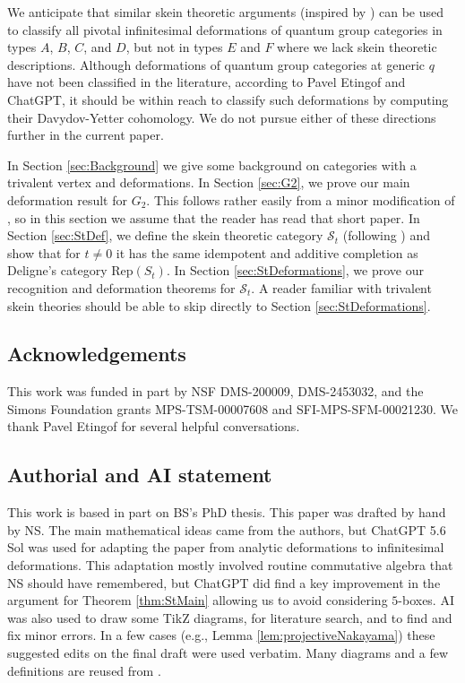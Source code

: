 \documentclass[12pt]{amsart}
\begin{document}
We anticipate that similar skein theoretic arguments (inspired by \cite{MR1237835, MR2132671,MR2783128,1507.06030}) can be used to classify all pivotal infinitesimal deformations of quantum group categories in types $A$, $B$, $C$, and $D$, but not in types $E$ and $F$ where we lack skein theoretic descriptions. Although deformations of quantum group categories at generic $q$ have not been classified in the literature, according to Pavel Etingof and ChatGPT, it should be within reach to classify such deformations by computing their Davydov-Yetter cohomology. We do not pursue either of these directions further in the current paper.

In Section \ref{sec:Background} we give some background on categories with a trivalent vertex and deformations. In Section \ref{sec:G2}, we prove our main deformation result for $G_2$. This follows rather easily from a minor modification of \cite{MR1265145}, so in this section we assume that the reader has read that short paper. In Section \ref{sec:StDef}, we define the skein theoretic category $\mathcal{S}_t$ (following \cite[\S6.2.1]{MR5101335}) and show that for $t \neq 0$ it has the same idempotent and additive completion as Deligne's category $\mathrm{Rep}(S_t)$. In Section \ref{sec:StDeformations}, we prove our recognition and deformation theorems for $\mathcal{S}_t$. A reader familiar with trivalent skein theories \cite{MR1265145,MR3624901,MR5101335} should be able to skip directly to Section \ref{sec:StDeformations}.

\subsection*{Acknowledgements}
This work was funded in part by NSF DMS-200009, DMS-2453032, and the Simons Foundation grants MPS-TSM-00007608 and SFI-MPS-SFM-00021230. We thank Pavel Etingof for several helpful conversations.

\subsection*{Authorial and AI statement}
This work is based in part on BS's PhD thesis. This paper was drafted by hand by NS. The main mathematical ideas came from the authors, but ChatGPT 5.6 Sol was used for adapting the paper from analytic deformations to infinitesimal deformations. This adaptation mostly involved routine commutative algebra that NS should have remembered, but ChatGPT did find a key improvement in the argument for Theorem \ref{thm:StMain} allowing us to avoid considering $5$-boxes. AI was also used to draw some TikZ diagrams, for literature search, and to find and fix minor errors. In a few cases (e.g., Lemma \ref{lem:projectiveNakayama}) these suggested edits on the final draft were used verbatim. Many diagrams and a few definitions are reused from \cite{MR5101335}.
\end{document}
